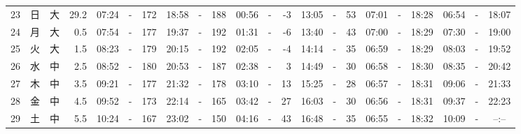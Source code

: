 \documentclass[12pt,a4j]{jsarticle}
\begin{document}
\begin{table}[htbp]
\begin{center}
{\begin{tabular}{|rc|cr|ccrccr|ccrccr|ccc|ccc|}
23 & 日 & 大 & 29.2 &  07:24 &-& 172 &  18:58 &-& 188 &  00:56 &-&  -3 &  13:05 &-&  53 & 07:01 & -& 18:28 & 06:54 & -& 18:07 \\
24 & 月 & 大 &  0.5 &  07:54 &-& 177 &  19:37 &-& 192 &  01:31 &-&  -6 &  13:40 &-&  43 & 07:00 & -& 18:29 & 07:30 & -& 19:00 \\
25 & 火 & 大 &  1.5 &  08:23 &-& 179 &  20:15 &-& 192 &  02:05 &-&  -4 &  14:14 &-&  35 & 06:59 & -& 18:29 & 08:03 & -& 19:52 \\
26 & 水 & 中 &  2.5 &  08:52 &-& 180 &  20:53 &-& 187 &  02:38 &-&   3 &  14:49 &-&  30 & 06:58 & -& 18:30 & 08:35 & -& 20:42 \\
27 & 木 & 中 &  3.5 &  09:21 &-& 177 &  21:32 &-& 178 &  03:10 &-&  13 &  15:25 &-&  28 & 06:57 & -& 18:31 & 09:06 & -& 21:33 \\
28 & 金 & 中 &  4.5 &  09:52 &-& 173 &  22:14 &-& 165 &  03:42 &-&  27 &  16:03 &-&  30 & 06:56 & -& 18:31 & 09:37 & -& 22:23 \\
29 & 土 & 中 &  5.5 &  10:24 &-& 167 &  23:02 &-& 150 &  04:16 &-&  43 &  16:48 &-&  35 & 06:55 & -& 18:32 & 10:09 & -& --:-- \\
   \hline
   \end{tabular}}
   \end{center}
\end{table}
\newpage
\end{document}
